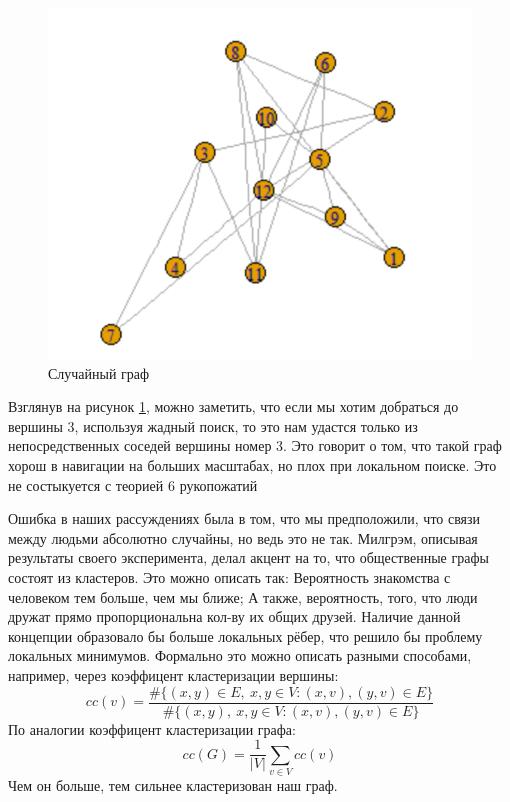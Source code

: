 \begin{figure}[H]
\centering
\includegraphics[scale=0.3]{./pictures/random_graph.png}
\caption{Случайный граф} \label{random_graph}
\end{figure}

Взглянув на рисунок \ref{random_graph}, можно заметить, что если мы хотим добраться до вершины 3,
используя жадный поиск, то это нам удастся только из непосредственных соседей вершины номер 3.
Это говорит о том, что такой граф хорош в навигации на больших масштабах, но плох при локальном
поиске. Это не состыкуется с теорией 6 рукопожатий

Ошибка в наших рассуждениях была в том, что мы предположили, что связи между людьми абсолютно
случайны, но ведь это не так. Милгрэм, описывая результаты своего эксперимента, делал акцент
на то, что общественные графы состоят из кластеров. Это можно описать так: Вероятность знакомства
с человеком тем больше, чем мы ближе; А также, вероятность, того, что люди дружат прямо пропорциональна
кол-ву их общих друзей. Наличие данной концепции образовало бы больше локальных рёбер, что решило бы
проблему локальных минимумов. Формально это можно описать разными способами, например, через коэффицент кластеризации вершины:
\begin{equation*}
    cc(v) = \frac{\#\{(x, y) \in E, \ x, y \in V: (x, v), (y, v) \in E\}}
    {\#\{(x, y), \ x, y \in V: (x, v), (y, v) \in E\}}
\end{equation*}
По аналогии коэффицент кластеризации графа:
\begin{equation*}
    cc(G) = \frac{1}{|V|}\sum_{v \in V}cc(v)
\end{equation*}
Чем он больше, тем сильнее кластеризован наш граф. 

